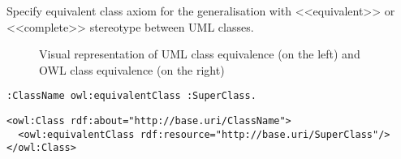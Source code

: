 \begin{trule}
	\label{rule:equivalent-classes-rc}
	Specify equivalent class axiom for the generalisation with <<equivalent>> or <<complete>> stereotype between UML classes.
\end{trule}

\enlargethispage{4em}

\vspace{-\parskip}\vspace{-\parskip}
\begin{figure}[!ht]
	\centering
	\begin{subfigure}{.5\textwidth}
		\centering
	\end{subfigure}%
	\begin{subfigure}{.5\textwidth}
		\centering
	\end{subfigure}
	\caption{Visual representation of UML class equivalence (on the left) and OWL class equivalence (on the right)}
	\label{fig:generalisation-equivalence-visual}
\end{figure}

\vspace{-\parskip}
\begin{minipage}[b]{.385\textwidth}
\begin{lstlisting}[language=Turtle, caption={Class equivalence in Turtle syntax}, captionpos=b]
:ClassName owl:equivalentClass :SuperClass.
\end{lstlisting}
\end{minipage}%
\quad\vspace{-\parskip}
\begin{minipage}[b]{.56\textwidth}
\begin{lstlisting}[language=RDF/XML, caption={Class equivalence in RDF/XML syntax}, captionpos=b]
<owl:Class rdf:about="http://base.uri/ClassName">
  <owl:equivalentClass rdf:resource="http://base.uri/SuperClass"/>
</owl:Class>
\end{lstlisting}
\end{minipage}
\vspace{-\parskip}

